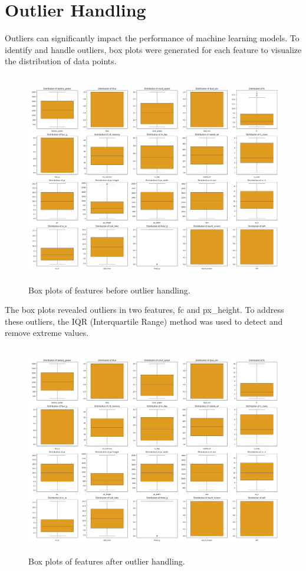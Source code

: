 \documentclass[12pt]{report}
\begin{document}
\section{Outlier Handling}
Outliers can significantly impact the performance of machine learning models. To identify and handle outliers, box plots were generated for each feature to visualize the distribution of data points. \\
\begin{figure}[H]
	\centering
	\includegraphics[height=25em]{box_plots_before.png}
	\caption{Box plots of features before outlier handling.}
	\label{box_plots_before}
\end{figure}
The box plots revealed outliers in two features, fc and px\_height. To address these outliers, the IQR (Interquartile Range) method was used to detect and remove extreme values.
\begin{figure}[H]
	\centering
	\includegraphics[height=25em]{box_plots_after.png}
	\caption{Box plots of features after outlier handling.}
	\label{box_plots_after}
\end{figure}
\end{document}
